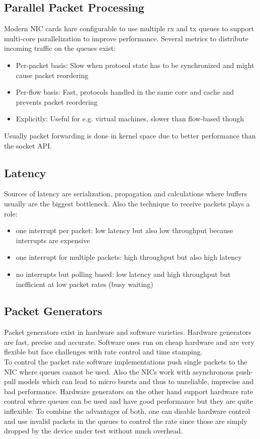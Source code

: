 \subsection{Parallel Packet Processing}
Modern NIC cards hare configurable to use multiple rx and tx queues to support multi-core parallelization to improve performance.
Several metrics to distribute incoming traffic on the queues exist:
\begin{itemize}
  \item Per-packet basis: Slow when protocol state has to be synchronized and might cause packet reordering
  \item Per-flow basis: Fast, protocols handled in the same core and cache and prevents packet reordering
  \item Explicitly: Useful for e.g. virtual machines, slower than flow-based though
\end{itemize}
Usually packet forwarding is done in kernel space due to better performance than the socket API.

\subsection{Latency}
Sources of latency are serialization, propagation and calculations where buffers usually are the biggest bottleneck.
Also the technique to receive packets plays a role:
\begin{itemize}
  \item one interrupt per packet: low latency but also low throughput because interrupts are expensive
  \item one interrupt for multiple packets: high throughput but also high latency
  \item no interrupts but polling based: low latency and high throughput but inefficient at low packet rates (busy waiting)
\end{itemize}

\subsection{Packet Generators}
Packet generators exist in hardware and software varieties.
Hardware generators are fast, precise and accurate.
Software ones run on cheap hardware and are very flexible but face challenges with rate control and time stamping.\\

To control the packet rate software implementations push single packets to the NIC where queues cannot be used.
Also the NICs work with asynchronous push-pull models which can lead to micro bursts and thus to unreliable, imprecise and bad performance.
Hardware generators on the other hand support hardware rate control where queues can be used and have good performance but they are quite inflexible.
To combine the advantages of both, one can disable hardware control and use invalid packets in the queues to control the rate since those are simply dropped by the device under test without much overhead.



